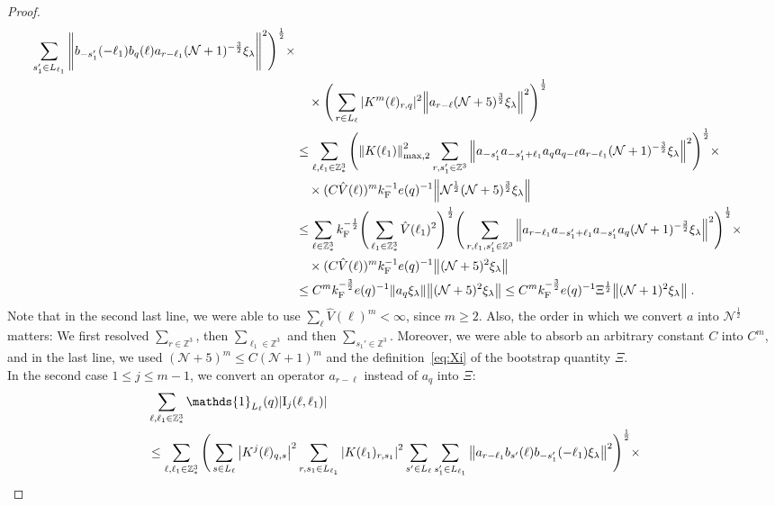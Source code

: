 \documentclass[12pt,a4paper]{article}
\numberwithin{equation}{section}
\newcommand{\cN}{\mathcal{N}}
\newcommand{\1}{\mathbb{I}}
\newcommand{\F}{\mathrm{F}}
\newcommand{\I}{\mathrm{I}}
\newcommand{\Z}{\mathbb{Z}}
\newcommand{\NN}{\mathcal{N}}
\newcommand{\half}{\frac{1}{2}}
\theoremstyle{plain}
\theoremstyle{definition}
\theoremstyle{remark}
\theoremstyle{plain}
\theoremstyle{definition}
\theoremstyle{remark}
\begin{document}
\begin{proof}
\begin{align}
		\sum_{s_1' \in L_{\ell_1}} \Bigg\Vert b_{-s_1'}(-\ell_1) b_{q}(\ell) a_{r-\ell_1} (\NN+1)^{-\frac 32}\xi_\lambda \Bigg\Vert^2\Bigg)^\half \times\nonumber\\
	&\quad \times \Bigg( \sum\limits_{r \in L_\ell} |K^{m}(\ell)_{r,q}|^2 \norm{ a_{r-\ell} (\NN+5)^{\frac 32}\xi_\lambda }^2\Bigg)^\half \nonumber\\
	&\leq \sum_{\ell,\ell_1 \in \Z^3_*} \Bigg( \norm{K(\ell_1)}_{\max,2}^2 \sum\limits_{r, s_1' \in \Z^3} \norm{ a_{-s_1'} a_{-s_1' + \ell_1} a_q a_{q-\ell} a_{r-\ell_1} (\NN+1)^{-\frac 32}\xi_\lambda}^2\Bigg)^\half \times\nonumber\\
	& \quad \times (C \hat{V}(\ell))^m k_{\F}^{-1} e(q)^{-1} \norm{ \NN^\half(\NN+5)^{\frac 32}\xi_\lambda } \nonumber\\
	&\leq \sum_{\ell \in \Z^3_*} k_{\F}^{-\half} \Bigg( \sum_{\ell_1 \in \Z^3_*} \hat{V}(\ell_1)^2 \Bigg)^{\half}
		\Bigg( \sum_{r,\ell_1,s_1' \in \Z^3}
		\norm{ a_{r-\ell_1} a_{-s_1'+\ell_1} a_{-s_1'} a_q  (\NN+1)^{-\frac 32}\xi_\lambda}^2\Bigg)^\half \times\nonumber\\
	& \quad \times (C \hat{V}(\ell))^m k_{\F}^{-1} e(q)^{-1} \norm{ (\NN+5)^2 \xi_\lambda } \nonumber\\
	&\leq C^m k_{\F}^{-\frac 32} e(q)^{-1}
		\norm{ a_q \xi_\lambda} \norm{(\NN+5)^2 \xi_\lambda}
	\leq C^m k_{\F}^{-\frac 32} e(q)^{-1} \Xi^\half
	 	\norm { (\NN+1)^2 \xi_\lambda } \;.\label{eq:estEQ1111}
\end{align}
Note that in the second last line, we were able to use $ \sum_\ell \hat{V}(\ell)^m < \infty $, since $ m \ge 2 $.
Also, the order in which we convert $ a $ into $ \cN^\half $ matters: We first resolved $ \sum_{r \in \Z^3} $, then $ \sum_{\ell_1 \in \Z^3} $  and then $ \sum_{s_1' \in \Z^3} $.
Moreover, we were able to absorb an arbitrary constant $ C $ into $ C^m $, and in the last line, we used $ (\cN+5)^m \le C (\cN+1)^m $ and the definition~\eqref{eq:Xi} of the bootstrap quantity $ \Xi $.\\
In the second case $ 1 \le j \le m-1 $, we convert an operator $ a_{r-\ell} $ instead of $ a_q $ into $ \Xi $:
\begin{align}
	&\sum_{\ell,\ell_1 \in \Z^3_*} \mathds{1}_{L_\ell}(q) |\I_j(\ell, \ell_1)| \nonumber\\
	&\leq \sum_{\ell,\ell_1 \in \Z^3_*} \Bigg( \sum\limits_{s \in L_\ell} \abs{K^j(\ell)_{q,s}}^2
		\sum\limits_{r, s_1 \in L_{\ell_1}} \abs{K(\ell_1)_{r,s_1}}^2
		\sum\limits_{s' \in L_\ell} \sum\limits_{s_1' \in L_{\ell_1}} \norm{a_{r-\ell_1} b_{s'}(\ell) b_{-s_1'}(-\ell_1) \xi_\lambda}^2 \Bigg)^\half \times \nonumber\\

\end{align}
\end{proof}
\end{document}
